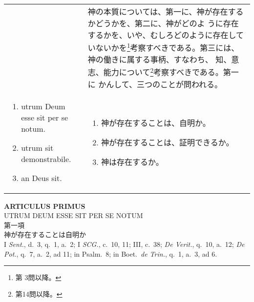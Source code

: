 \documentclass[10pt]{jsarticle}
\begin{document}
\begin{longtable}{p{21em}p{21em}}
&

神の本質については、第一に、神が存在するかどうかを、第二に、神がどのよ
うに存在するかを、いや、むしろどのように存在していないかを\footnote{第
3問以降。}考察すべきである。第三には、神の働きに属する事柄、すなわち、
知、意志、能力について\footnote{第14問以降。}考察すべきである。第一に
かんして、三つのことが問われる。

\\

\begin{enumerate}
 \item utrum Deum esse sit per se notum. 
 \item utrum sit demonstrabile. 
 \item an Deus sit.
\end{enumerate}

&

\begin{enumerate}
 \item 神が存在することは、自明か。
 \item 神が存在することは、証明できるか。 
 \item 神は存在するか。
\end{enumerate}

\end{longtable}

\newpage
{}

\begin{center}
 {\Large {\bf ARTICULUS PRIMUS}}\\
 {\large UTRUM  DEUM ESSE SIT PER SE NOTUM}\\
 {\Large 第一項\\神が存在することは自明か}\\
 {\footnotesize I {\it Sent.}, d.~3, q.~1, a.~2; I {\it SCG.}, c.~10, 11;
 III, c.~38; {\it De Verit.}, q.~10, a.~12; {\it De Pot.}, q.~7, a.~2,
 ad 11; in Psalm.~8; in Boet.~{\it de Trin.}, q.~1, a.~3, ad 6.}

\end{center}
\end{document}
